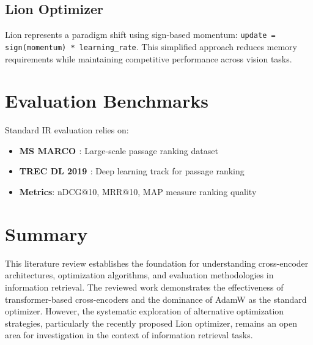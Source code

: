 \subsection{Lion Optimizer}
Lion \cite{chen2023symbolic} represents a paradigm shift using sign-based momentum: \texttt{update = sign(momentum) * learning\_rate}. This simplified approach reduces memory requirements while maintaining competitive performance across vision tasks.

\section{Evaluation Benchmarks}

Standard IR evaluation relies on:
\begin{itemize}
\item \textbf{MS MARCO \cite{DBLP:journals/corr/NguyenRSGTMD16}}: Large-scale passage ranking dataset
\item \textbf{TREC DL 2019 \cite{craswell2020overview}}: Deep learning track for passage ranking
\item \textbf{Metrics}: nDCG@10, MRR@10, MAP measure ranking quality
\end{itemize}

\section{Summary}

This literature review establishes the foundation for understanding cross-encoder architectures, optimization algorithms, and evaluation methodologies in information retrieval. The reviewed work demonstrates the effectiveness of transformer-based cross-encoders and the dominance of AdamW as the standard optimizer. However, the systematic exploration of alternative optimization strategies, particularly the recently proposed Lion optimizer, remains an open area for investigation in the context of information retrieval tasks.





